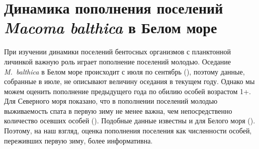 		\chapter{Динамика пополнения поселений {\it Macoma balthica} в Белом море}
При изучении динамики поселений бентосных организмов с планктонной личинкой важную роль играет пополнение поселений молодью. 
Оседание {\it M.~balthica} в Белом море происходит с июля по сентябрь (\cite{Semenova_1980, Maximovich_1985}), поэтому данные, собранные в июле, не описывают величину оседания в текущем году. 
Однако мы можем оценить пополнение предыдущего года по обилию особей возрастом 1+. 
Для Северного моря показано, что в пополнении поселений молодью выживаемость спата в первую зиму не менее важна, чем непосредственно количество осевших особей (\cite{Beukema_et_al_1998, Strasser_Gunter_2001}). Подобные данные известны и для Белого моря (\cite{Maximovich_Gerasimova_2004}). Поэтому, на наш взгляд, оценка пополнения поселения как численности особей, переживших первую зиму, более информативна.







\par\bigskip

